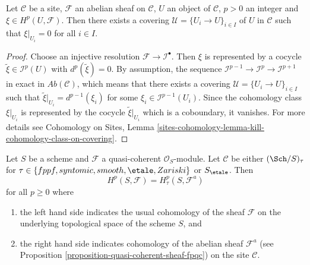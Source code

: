\begin{lemma}
\label{lemma-locality-cohomology}
Let $\mathcal{C}$ be a site, $\mathcal{F}$ an abelian sheaf on $\mathcal{C}$,
$U$ an object of $\mathcal{C}$, $p >0$ an integer and $\xi \in
H^p(U, \mathcal{F})$. Then there exists a covering
$\mathcal{U} = \{U_i \to U\}_{i \in I}$ of $U$ in $\mathcal{C}$
such that $\xi |_{U_i} = 0$ for all $i \in I$.
\end{lemma}

\begin{proof}
Choose an injective resolution $\mathcal{F} \to \mathcal{I}^\bullet$. Then
$\xi$ is represented by a cocycle $\tilde{\xi} \in \mathcal{I}^p(U)$
with $d^p(\tilde{\xi}) = 0$. By assumption, the sequence
$\mathcal{I}^{p - 1} \to \mathcal{I}^p \to \mathcal{I}^{p + 1}$ in exact in
$\textit{Ab}(\mathcal{C})$, which means that there exists a covering
$\mathcal{U} = \{U_i \to U\}_{i \in I}$ such that
$\tilde{\xi}|_{U_i} = d^{p - 1}(\xi_i)$ for some
$\xi_i \in \mathcal{I}^{p-1}(U_i)$. Since
the cohomology class $\xi|_{U_i}$ is represented by the cocycle
$\tilde{\xi}|_{U_i}$ which is a coboundary, it vanishes.
For more details see
Cohomology on Sites,
Lemma \ref{sites-cohomology-lemma-kill-cohomology-class-on-covering}.
\end{proof}

\begin{theorem}
\label{theorem-zariski-fpqc-quasi-coherent}
Let $S$ be a scheme and $\mathcal{F}$ a quasi-coherent $\mathcal{O}_S$-module.
Let $\mathcal{C}$ be either $(\Sch/S)_\tau$ for
$\tau \in \{fppf, syntomic, smooth, \etale, Zariski\}$ or
$S_\etale$. Then
$$
H^p(S, \mathcal{F}) = H^p_\tau(S, \mathcal{F}^a)
$$
for all $p \geq 0$ where
\begin{enumerate}
\item the left hand side indicates the usual cohomology of the sheaf
$\mathcal{F}$ on the underlying topological space of the scheme $S$, and
\item the right hand side indicates cohomology
of the abelian sheaf $\mathcal{F}^a$ (see
Proposition \ref{proposition-quasi-coherent-sheaf-fpqc})
on the site $\mathcal{C}$.
\end{enumerate}
\end{theorem}

